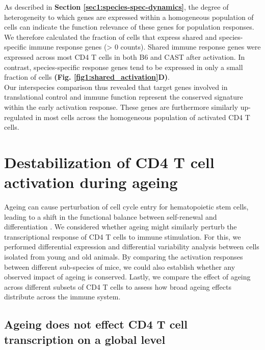 As described in \textbf{Section \ref{sec1:species-spec-dynamics}}, the degree of heterogeneity to which genes are expressed within a homogeneous population of cells can indicate the function relevance of these genes for population responses. We therefore calculated the fraction of cells that express shared and species-specific immune response genes (> 0 counts). Shared immune response genes were expressed across most CD4\plus{} T cells in both B6 and CAST after activation. In contrast, species-specific response genes tend to be expressed in only a small fraction of cells \textbf{(Fig. \ref{fig1:shared_activation}D)}. \\

Our interspecies comparison thus revealed that target genes involved in translational control and immune function represent the conserved signature within the early activation response. These genes are furthermore similarly up-regulated in most cells across the homogeneous population of activated CD4\plus{} T cells. 

\newpage

\section{Destabilization of CD4\plus{} T cell activation during ageing}

Ageing can cause perturbation of cell cycle entry for hematopoietic stem cells, leading to a shift in the functional balance between self-renewal and differentiation \citep{Kowalczyk2015}. We considered whether ageing might similarly perturb the transcriptional response of CD4\plus{} T cells to immune stimulation. For this, we performed differential expression and differential variability analysis between cells isolated from young and old animals. By comparing the activation responses between different sub-species of mice, we could also establish whether any observed impact of ageing is conserved. Lastly, we compare the effect of ageing across different subsets of CD4\plus{} T cells to assess how broad ageing effects distribute across the immune system.

\subsection{Ageing does not effect CD4\plus{} T cell transcription on a global level}
\label{sec1:global_changes}

